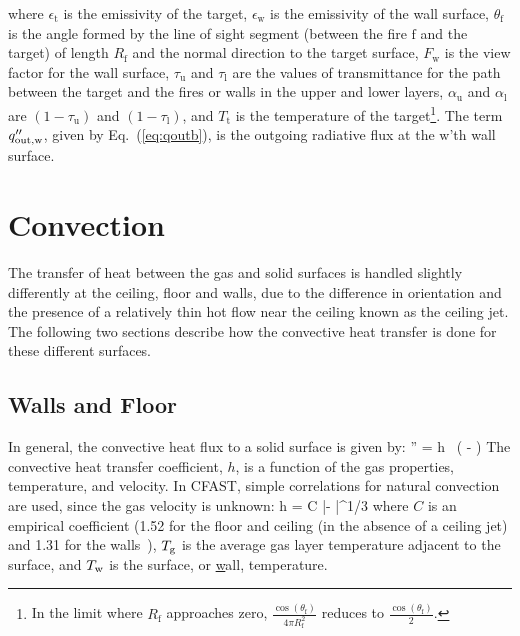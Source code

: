 \documentclass[12pt,twoside]{book}
\begin{document}
where $\epsilon_{\mathrm{t}}$ is the emissivity of the target, $\epsilon_{\mathrm{w}}$ is the emissivity of the wall surface, $\theta_{\mathrm{f}}$ is the angle formed by the line of sight segment (between the fire $\mathrm{f}$ and the target) of length $R_{\mathrm{f}}$ and the normal direction to the target surface, $F_{\mathrm{w}}$ is the view factor for the wall surface, $\tau_{\mathrm{u}}$ and $\tau_{\mathrm{l}}$ are the values of transmittance for the path between the target and the fires or walls in the upper and lower layers, $\alpha_{\mathrm{u}}$ and $\alpha_{\mathrm{l}}$ are $\left( 1-\tau_{\mathrm{u}} \right)$ and $\left( 1-\tau_{\mathrm{l}} \right)$, and $T_{\mathrm{t}}$ is the temperature of the target\footnote{In the limit where $R_{\mathrm{f}}$ approaches zero, $\frac{\cos(\theta_{\mathrm{f}})}{4 \pi R_{\mathrm{f}}^2}$ reduces to $\frac{\cos(\theta_{\mathrm{f}})}{2}$.}. The term $q_{{\mathrm{out}},\mathrm{w}}''$, given by Eq.~(\ref{eq:qoutb}), is the outgoing radiative flux at the $\mathrm{w}$'th wall surface.



\section{Convection}
\label{section:convection}

The transfer of heat between the gas and solid surfaces is handled slightly differently at the ceiling, floor and walls, due to the difference in orientation and the presence of a relatively thin hot flow near the ceiling known as the ceiling jet. The following two sections describe how the convective heat transfer is done for these different surfaces.

\subsection{Walls and Floor}

In general, the convective heat flux to a solid surface is given by:
\be
   \dqc'' = h \, \left( \Tg - \Tw \right)  \label{convective_heat_flux}
\ee
The convective heat transfer coefficient, $h$, is a function of the gas properties, temperature, and velocity. In CFAST, simple correlations for natural convection are used, since the gas velocity is unknown:
\be
   h = C {|\Tg - \Tw|}^{1/3}
\ee
where $C$ is an empirical coefficient (1.52 for the floor and ceiling (in the absence of a ceiling jet) and 1.31 for the walls~\cite{Holman:1990}), $T\sb{\mathrm{g}}$ is the average gas layer temperature adjacent to the surface, and $T\sb{\mathrm{w}}$ is the surface, or \underline{w}all, temperature.
\end{document}
